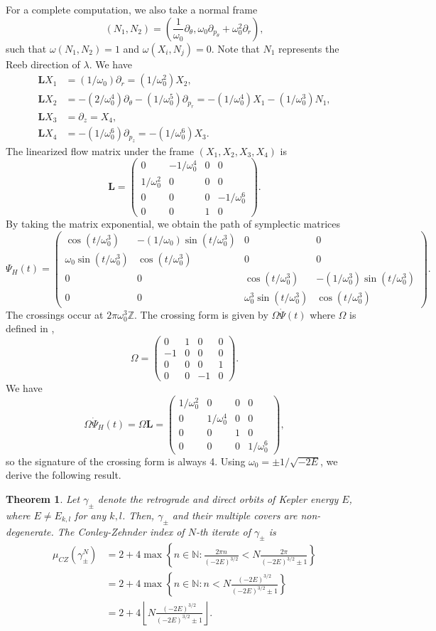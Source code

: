 \documentclass{amsart}
\newcommand{\N}{\mathbb{N}}
\newcommand{\Z}{\mathbb{Z}}
\renewcommand{\o}{\omega}
\newcommand{\g}{\gamma}
\newcommand{\pp}{\partial}
\newtheorem{thm}{Theorem}[section]
\begin{document}
For a complete computation, we also take a normal frame
$$
(N_1, N_2)=\left( \frac{1}{\o_0}\pp_{\theta},\o_0\pp_{p_\theta}+\o_0^2\pp_r\right),
$$
such that $\o(N_1,N_2)=1$ and $\o(X_i,N_j)=0$.
Note that $N_1$ represents the Reeb direction of $\lambda$.
We have
$$
\begin{aligned}
	\mathbf{L}X_1 &= (1/\o_0)\pp_r = (1/\o_0^2)X_2,\\
	\mathbf{L}X_2 &= -(2/\o_0^4) \pp_\theta - (1/\o_0^5)\pp_{p_r}
	=-(1/\o_0^4)X_1 - (1/\o_0^3)N_1,\\
	\mathbf{L}X_3 &= \pp_z = X_4,\\
	\mathbf{L}X_4 &= -(1/\o_0^6)\pp_{p_z}=-(1/\o_0^6)X_3.
\end{aligned}
$$
The linearized flow matrix under the frame $(X_1,X_2,X_3,X_4)$ is
$$
\mathbf{L}=\begin{pmatrix}
	0&-1/\o_0^4&0&0\\
	1/\o_0^2&0&0&0\\
	0&0&0&-1/\o_0^6\\
	0&0&1&0
\end{pmatrix}.
$$
By taking the matrix exponential, we obtain the path of symplectic matrices
$$
\Psi_H(t)=\begin{pmatrix}
	\cos(t/\o_0^3)&-(1/\o_0)\sin(t/\o_0^3)&0&0\\
	\o_0\sin(t/\o_0^3)&\cos(t/\o_0^3)&0&0\\
	0&0&\cos(t/\o_0^3)&-(1/\o_0^3)\sin(t/\o_0^3)\\
	0&0&\o_0^3\sin(t/\o_0^3)&\cos(t/\o_0^3)
\end{pmatrix}.
$$
The crossings occur at $2\pi\o_0^3\Z$.
The crossing form is given by $\Omega \dot{\Psi}(t)$ where $\Omega$ is defined in ,
$$
\Omega = \begin{pmatrix}
	0&1&0&0\\
	-1&0&0&0\\
	0&0&0&1\\
	0&0&-1&0
\end{pmatrix}.
$$
We have
$$
\Omega\dot{\Psi}_H(t)=\Omega\mathbf{L} = \begin{pmatrix}
	1/\o_0^2&0&0&0\\
	0&1/\o_0^4&0&0\\
	0&0&1&0\\
	0&0&0&1/\o_0^6
\end{pmatrix},
$$
so the signature of the crossing form is always 4.
Using $\o_0=\pm1/\sqrt{-2E}$, we derive the following result.
\begin{thm}\label{Theorem - Index of planar circular orbits}
	Let $\g_\pm$ denote the retrograde and direct orbits of Kepler energy $E$, where $E\neq E_{k,l}$ for any $k,l$.
	Then, $\g_{\pm}$ and their multiple covers are non-degenerate.
	The Conley-Zehnder index of $N$-th iterate of $\g_\pm$ is
	$$
	\begin{aligned}
		\mu_{CZ}(\g_\pm^N)
		&= 2 + 4\max\left\{n\in \N:\frac{2\pi n}{(-2E)^{3/2}}<N\frac{2\pi}{(-2E)^{3/2}\pm 1}\right\}\\
		&=2 + 4\max\left\{n\in\N:n<N\frac{(-2E)^{3/2}}{(-2E)^{3/2}\pm1}
		\right\}\\
		&=2+4\left\lfloor N\frac{(-2E)^{3/2}}{(-2E)^{3/2}\pm1}\right\rfloor.
	\end{aligned}
	$$
\end{thm}
\end{document}
